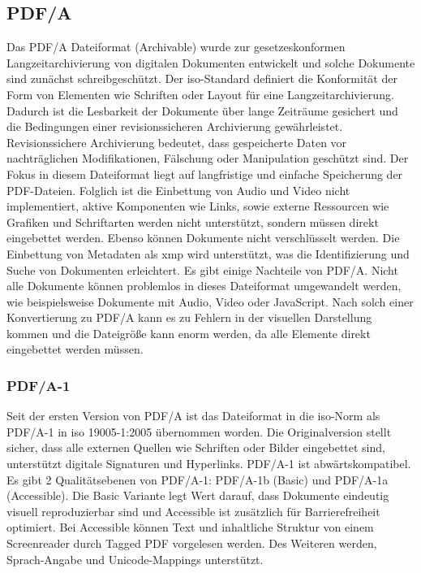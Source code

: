 \subsection{PDF/A}
Das PDF/A Dateiformat (Archivable) wurde zur gesetzeskonformen Langzeitarchivierung von digitalen Dokumenten entwickelt und solche Dokumente sind zunächst schreibgeschützt. Der \gls{iso}-Standard definiert die Konformität der Form von Elementen wie Schriften oder Layout für eine Langzeitarchivierung. Dadurch ist die Lesbarkeit der Dokumente über lange Zeiträume gesichert und die Bedingungen einer revisionssicheren Archivierung gewährleistet. \cite{adobe-pdf-a} Revisionssichere Archivierung bedeutet, dass gespeicherte Daten vor nachträglichen Modifikationen, Fälschung oder Manipulation geschützt sind. \cite{adobe-revisions} Der Fokus in diesem Dateiformat liegt auf langfristige und einfache Speicherung der PDF-Dateien. Folglich ist die Einbettung von Audio und Video nicht implementiert, aktive Komponenten wie Links, sowie externe Ressourcen wie Grafiken und Schriftarten werden nicht unterstützt, sondern müssen direkt eingebettet werden. Ebenso können Dokumente nicht verschlüsselt werden. Die Einbettung von Metadaten als \gls{xmp} wird unterstützt, was die Identifizierung und Suche von Dokumenten erleichtert. Es gibt einige Nachteile von PDF/A. Nicht alle Dokumente können problemlos in dieses Dateiformat umgewandelt werden, wie beispielsweise Dokumente mit Audio, Video oder JavaScript. Nach solch einer Konvertierung zu PDF/A kann es zu Fehlern in der visuellen Darstellung kommen und die Dateigröße kann enorm werden, da alle Elemente direkt eingebettet werden müssen. \cite{adobe-pdf-a}

\subsubsection{PDF/A-1}
Seit der ersten Version von PDF/A ist das Dateiformat in die \gls{iso}-Norm als PDF/A-1 in \gls{iso} 19005-1:2005 übernommen worden. \cite{proj-consult} Die Originalversion stellt sicher, dass alle externen Quellen wie Schriften oder Bilder eingebettet sind, unterstützt digitale Signaturen und Hyperlinks. PDF/A-1 ist abwärtskompatibel. Es gibt 2 Qualitätsebenen von PDF/A-1: PDF/A-1b (Basic) und PDF/A-1a (Accessible). Die Basic Variante legt Wert darauf, dass Dokumente eindeutig visuell reproduzierbar sind und Accessible ist zusätzlich für Barrierefreiheit optimiert. Bei Accessible können Text und inhaltliche Struktur von einem Screenreader durch Tagged PDF vorgelesen werden. \cite{adobe-pdf-a} Des Weiteren werden, Sprach-Angabe und Unicode-Mappings unterstützt. \cite{proj-consult}

